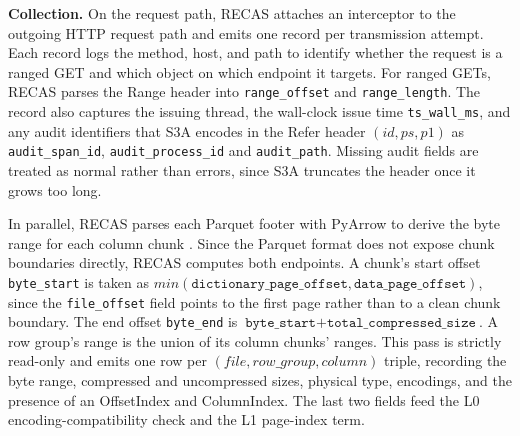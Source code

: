 \textbf{Collection.} 
On the request path, RECAS attaches an interceptor to the outgoing HTTP request path and emits one record per transmission attempt. Each record logs the method, host, and path to identify whether the request is a ranged GET and which object on which endpoint it targets. For ranged GETs, RECAS parses the Range header into \texttt{range\_offset} and \texttt{range\_length}. %
The record also captures the issuing thread, the wall-clock issue time \texttt{ts\_wall\_ms}, and any audit identifiers that S3A encodes in the Refer header $(id, ps, p1)$ as \texttt{audit\_span\_id}, \texttt{audit\_process\_id} and \texttt{audit\_path}. 
Missing audit fields are treated as normal rather than errors, since S3A truncates the header once it grows too long.

In parallel, RECAS parses %
each Parquet footer with PyArrow to derive the byte range for each column chunk%
. %
Since the Parquet format does not expose chunk boundaries directly, RECAS computes both endpoints. A chunk's start offset \texttt{byte\_start} is taken as $min(\texttt{dictionary\_page\_offset}, \texttt{data\_page\_offset})$, since the \texttt{file\_offset} field points to the first page rather than to a clean chunk boundary. The end offset \texttt{byte\_end} is  $\texttt{byte\_start}+\texttt{total\_compressed\_size}$. A row group's range is the union of its column chunks' ranges. This pass is strictly read-only and emits one row per $(file, row\_group, column)$ triple, recording the byte range, compressed and uncompressed sizes, physical type, encodings, and the presence of an OffsetIndex and ColumnIndex. %
The last two fields feed the L0 encoding-compatibility check and the L1 page-index term.

